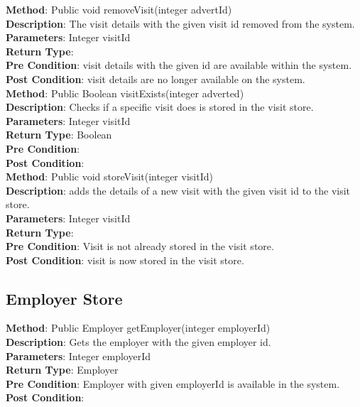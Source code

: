 \documentclass{l3deliverable}
\begin{document}
\textbf{Method}: Public void removeVisit(integer advertId)\\
\textbf{Description}: The visit details with the given visit id removed from the system. \\
\textbf{Parameters}: Integer visitId\\
\textbf{Return Type}:\\
\textbf{Pre Condition}: visit details with the given id are available within the system.\\
\textbf{Post Condition}: visit details are no longer available on the system.\\

\textbf{Method}: Public Boolean visitExists(integer adverted)\\
\textbf{Description}: Checks if a specific visit does is stored in the visit store. \\
\textbf{Parameters}: Integer visitId\\
\textbf{Return Type}: Boolean\\
\textbf{Pre Condition}:\\
\textbf{Post Condition}:\\

\textbf{Method}: Public void storeVisit(integer visitId) \\
\textbf{Description}:  adds the details of a new visit with the given visit id to the visit store.\\
\textbf{Parameters}: Integer visitId\\
\textbf{Return Type}:\\
\textbf{Pre Condition}: Visit is not already stored in the visit store.\\
\textbf{Post Condition}: visit is now stored in the visit store.\\

\subsection{Employer Store}

\textbf{Method}: Public Employer getEmployer(integer employerId)\\
\textbf{Description}: Gets the employer with the given employer id.\\
\textbf{Parameters}:  Integer employerId\\
\textbf{Return Type}: Employer\\
\textbf{Pre Condition}: Employer with given employerId is available in the system.\\
\textbf{Post Condition}:\\
\end{document}
